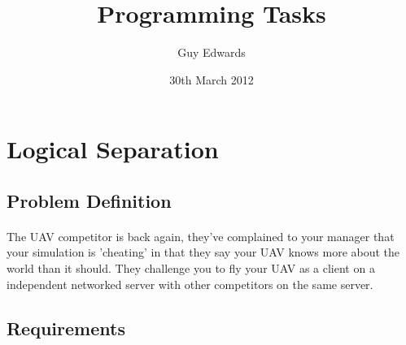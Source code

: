 \documentclass[11pt]{book}
\title{\textbf{Programming Tasks}}
\author{Guy Edwards}
\date{30th March 2012}
\begin{document}
\section{Logical Separation}

\subsection{Problem Definition}

\paragraph{} The UAV competitor is back again, they've complained to your manager that your simulation is 'cheating' in that they say your UAV knows more about the world than it should. They challenge you to fly your UAV as a client on a independent networked server with other competitors on the same server.

\subsection{Requirements}
\end{document}
